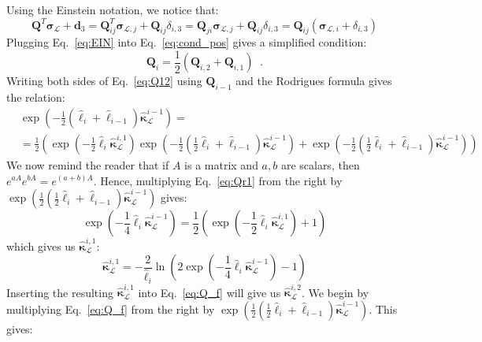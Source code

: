 \documentclass[a4paper, 11pt]{article}
\begin{document}
Using the Einstein notation, we notice that:
\begin{equation}\label{eq:EIN}
   \boldsymbol{Q}^T\boldsymbol{\sigma}_\mathcal{L}+\boldsymbol{d}_3=\boldsymbol{Q}^T_{ij} \boldsymbol{\sigma}_{\mathcal{L},j}+\boldsymbol{Q}_{ij}\delta_{i,3}=\boldsymbol{Q}_{ji} \boldsymbol{\sigma}_{\mathcal{L},j}+\boldsymbol{Q}_{ij}\delta_{i,3}=\boldsymbol{Q}_{ij}\left(\boldsymbol{\sigma}_{\mathcal{L},i}+\delta_{i,3}\right)
\end{equation}
Plugging Eq.~\ref{eq:EIN} into Eq.~\ref{eq:cond_pos} gives a simplified condition:
\begin{equation}\label{eq:Q12}
    \boldsymbol{Q}_i=\frac{1}{2}\left(\boldsymbol{Q}_{i,2}+\boldsymbol{Q}_{i,1}\right)\;\;.
\end{equation}
Writing both sides of Eq.~\ref{eq:Q12} using $\boldsymbol{Q}_{i-1}$ and the Rodrigues formula gives the relation:
\begin{align}\label{eq:Qr1}
    &\exp\left(-\frac{1}{2}(\hat{\ell}_{i}+\hat{\ell}_{i-1})\hat{\boldsymbol{\kappa}}^{i-1}_\mathcal{L}\right)=\nonumber\\
    &=\frac{1}{2}\left(\exp\left(-\frac{1}{2}\hat{\ell}_i\hat{\boldsymbol{\kappa}}^{i,1}_\mathcal{L}\right)\exp\left(-\frac{1}{2}(\frac{1}{2}\hat{\ell}_{i}+\hat{\ell}_{i-1})\hat{\boldsymbol{\kappa}}^{i-1}_\mathcal{L}\right)+
    \exp\left(-\frac{1}{2}(\frac{1}{2}\hat{\ell}_{i}+\hat{\ell}_{i-1})\hat{\boldsymbol{\kappa}}^{i-1}_\mathcal{L}\right)\right)
\end{align}
We now remind the reader that if $A$ is a matrix and $a,b$ are scalars, then $e^{aA}e^{bA}=e^{(a+b)A}$. Hence, multiplying Eq.~\ref{eq:Qr1} from the right by $\exp\left(\frac{1}{2}(\frac{1}{2}\hat{\ell}_{i}+\hat{\ell}_{i-1})\hat{\boldsymbol{\kappa}}^{i-1}_\mathcal{L}\right)$ gives: 
\begin{equation}\label{eq:k1_1}
    \exp\left(-\frac{1}{4}\hat{\ell}_{i}\hat{\boldsymbol{\kappa}}^{i-1}_\mathcal{L}\right)=\frac{1}{2}\left(\exp\left(-\frac{1}{2}\hat{\ell}_i\hat{\boldsymbol{\kappa}}^{i,1}_\mathcal{L}\right)+1\right)
\end{equation}
which gives us $\hat{\boldsymbol{\kappa}}^{i,1}_\mathcal{L}$:
\begin{equation}\label{eq:kappa1}
    \hat{\boldsymbol{\kappa}}^{i,1}_\mathcal{L}=-\frac{2}{\hat{\ell}_{i}}\ln{\left(2\exp\left(-\frac{1}{4}\hat{\ell}_{i}\hat{\boldsymbol{\kappa}}^{i-1}_\mathcal{L}\right)-1\right)}
\end{equation}
Inserting the resulting $\hat{\boldsymbol{\kappa}}^{i,1}_\mathcal{L}$ into Eq.~\ref{eq:Q_f} will give us $\hat{\boldsymbol{\kappa}}^{i,2}_\mathcal{L}$. We begin by multiplying Eq.~\ref{eq:Q_f} from the right by $\exp\left(\frac{1}{2}(\frac{1}{2}\hat{\ell}_{i}+\hat{\ell}_{i-1})\hat{\boldsymbol{\kappa}}^{i-1}_\mathcal{L}\right)$. This gives:
\end{document}
